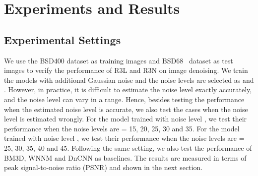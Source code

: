 \documentclass{article}
\begin{document}
\begin{table}[htbp]
\centering
\caption{Specific design of the layers} \label{tab:layer}
\end{table}


\section{Experiments and Results}
\subsection{Experimental Settings}
We use the  BSD400 dataset as training images and BSD68~\cite{1467533} dataset as test images to verify the performance of R3L and R3N on image denoising. We train the models with additional Gaussian noise and the noise levels are selected as  and . However, in practice, it is difficult to estimate the noise level exactly accurately, and the noise level can vary in a range. Hence, besides testing the performance when the estimated noise level is accurate, we also test the cases when the noise level is estimated wrongly. For the model trained with noise level , we test their performance when the noise levels are  = 15, 20, 25, 30 and 35. For the model trained with noise level , we test their performance when the noise levels are  = 25, 30, 35, 40 and 45. Following the same setting, we also test the performance of BM3D, WNNM and DnCNN as baselines. The results are measured in terms of peak signal-to-noise ratio (PSNR) and shown in the next section.
\end{document}
